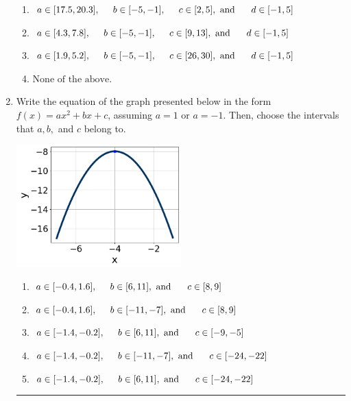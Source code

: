 \documentclass[14pt]{extbook}
\newcommand{\litem}[1]{\item#1\hspace*{-1cm}\rule{\textwidth}{0.4pt}}
\begin{document}
\begin{enumerate}
{\begin{enumerate}[label=\Alph*.]
\item \( a \in [17.5, 20.3], \hspace*{5mm} b \in [-5, -1], \hspace*{5mm} c \in [2, 5], \text{ and } \hspace*{5mm} d \in [-1, 5] \)
\item \( a \in [4.3, 7.8], \hspace*{5mm} b \in [-5, -1], \hspace*{5mm} c \in [9, 13], \text{ and } \hspace*{5mm} d \in [-1, 5] \)
\item \( a \in [1.9, 5.2], \hspace*{5mm} b \in [-5, -1], \hspace*{5mm} c \in [26, 30], \text{ and } \hspace*{5mm} d \in [-1, 5] \)
\item \( \text{None of the above.} \)

\end{enumerate} }
\litem{
Write the equation of the graph presented below in the form $f(x)=ax^2+bx+c$, assuming  $a=1$ or $a=-1$. Then, choose the intervals that $a, b,$ and $c$ belong to.
\begin{center}
    \includegraphics[width=0.5\textwidth]{../Figures/quadraticGraphToEquationCopyB.png}
\end{center}
\begin{enumerate}[label=\Alph*.]
\item \( a \in [-0.4, 1.6], \hspace*{5mm} b \in [6, 11], \text{ and } \hspace*{5mm} c \in [8, 9] \)
\item \( a \in [-0.4, 1.6], \hspace*{5mm} b \in [-11, -7], \text{ and } \hspace*{5mm} c \in [8, 9] \)
\item \( a \in [-1.4, -0.2], \hspace*{5mm} b \in [6, 11], \text{ and } \hspace*{5mm} c \in [-9, -5] \)
\item \( a \in [-1.4, -0.2], \hspace*{5mm} b \in [-11, -7], \text{ and } \hspace*{5mm} c \in [-24, -22] \)
\item \( a \in [-1.4, -0.2], \hspace*{5mm} b \in [6, 11], \text{ and } \hspace*{5mm} c \in [-24, -22] \)


\end{enumerate}}
\end{enumerate}
\end{document}
